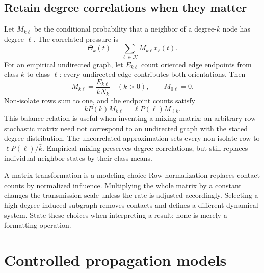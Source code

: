 \documentclass[11pt,a4paper]{article}
\theoremstyle{definition}
\theoremstyle{remark}
\begin{document}
\subsection{Retain degree correlations when they matter}
Let $M_{k\ell}$ be the conditional probability that a neighbor of a degree-$k$ node has degree $\ell$. The correlated pressure is
\begin{equation}
\Theta_k(t)=\sum_{\ell\in\mathcal K}M_{k\ell}x_\ell(t).
\end{equation}
For an empirical undirected graph, let $E_{k\ell}$ count oriented edge endpoints from class $k$ to class $\ell$: every undirected edge contributes both orientations. Then
\begin{equation}
M_{k\ell}=\frac{E_{k\ell}}{kN_k}\quad(k>0),\qquad M_{0\ell}=0.
\label{eq:empirical-mixing}
\end{equation}
Non-isolate rows sum to one, and the endpoint counts satisfy
\begin{equation}
kP(k)M_{k\ell}=\ell P(\ell)M_{\ell k}.
\end{equation}
This balance relation is useful when inventing a mixing matrix: an arbitrary row-stochastic matrix need not correspond to an undirected graph with the stated degree distribution. The uncorrelated approximation sets every non-isolate row to $\ell P(\ell)/\bar k$. Empirical mixing preserves degree correlations, but still replaces individual neighbor states by their class means.

\begin{keyidea}{A matrix transformation is a modeling choice}
Row normalization replaces contact counts by normalized influence. Multiplying the whole matrix by a constant changes the transmission scale unless the rate is adjusted accordingly. Selecting a high-degree induced subgraph removes contacts and defines a different dynamical system. State these choices when interpreting a result; none is merely a formatting operation.
\end{keyidea}

\section{Controlled propagation models}
\end{document}
